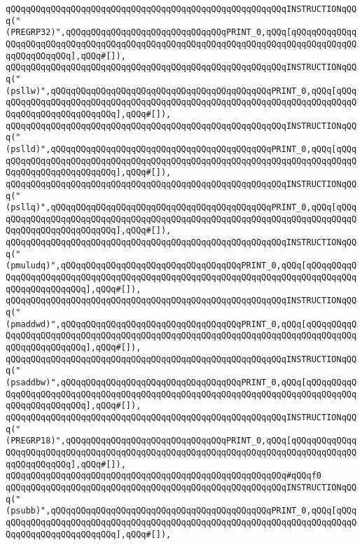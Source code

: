 \verb|qQQqqQQqqQQqqQQqqQQqqQQqqQQqqQQqqQQqqQQqqQQqqQQqqQQqqQQqINSTRUCTIONqQQq("(PREGRP32)",qQQqqQQqqQQqqQQqqQQqqQQqqQQqqQQqPRINT_0,qQQq[qQQqqQQqqQQqqQQqqQQqqQQqqQQqqQQqqQQqqQQqqQQqqQQqqQQqqQQqqQQqqQQqqQQqqQQqqQQqqQQqqQQqqQQqqQQqqQQq],qQQq#[]),|\newline
\verb|qQQqqQQqqQQqqQQqqQQqqQQqqQQqqQQqqQQqqQQqqQQqqQQqqQQqqQQqINSTRUCTIONqQQq("(psllw)",qQQqqQQqqQQqqQQqqQQqqQQqqQQqqQQqqQQqqQQqqQQqPRINT_0,qQQq[qQQqqQQqqQQqqQQqqQQqqQQqqQQqqQQqqQQqqQQqqQQqqQQqqQQqqQQqqQQqqQQqqQQqqQQqqQQqqQQqqQQqqQQqqQQqqQQq],qQQq#[]),|\newline
\verb|qQQqqQQqqQQqqQQqqQQqqQQqqQQqqQQqqQQqqQQqqQQqqQQqqQQqqQQqINSTRUCTIONqQQq("(pslld)",qQQqqQQqqQQqqQQqqQQqqQQqqQQqqQQqqQQqqQQqqQQqPRINT_0,qQQq[qQQqqQQqqQQqqQQqqQQqqQQqqQQqqQQqqQQqqQQqqQQqqQQqqQQqqQQqqQQqqQQqqQQqqQQqqQQqqQQqqQQqqQQqqQQqqQQq],qQQq#[]),|\newline
\verb|qQQqqQQqqQQqqQQqqQQqqQQqqQQqqQQqqQQqqQQqqQQqqQQqqQQqqQQqINSTRUCTIONqQQq("(psllq)",qQQqqQQqqQQqqQQqqQQqqQQqqQQqqQQqqQQqqQQqqQQqPRINT_0,qQQq[qQQqqQQqqQQqqQQqqQQqqQQqqQQqqQQqqQQqqQQqqQQqqQQqqQQqqQQqqQQqqQQqqQQqqQQqqQQqqQQqqQQqqQQqqQQqqQQq],qQQq#[]),|\newline
\verb|qQQqqQQqqQQqqQQqqQQqqQQqqQQqqQQqqQQqqQQqqQQqqQQqqQQqqQQqINSTRUCTIONqQQq("(pmuludq)",qQQqqQQqqQQqqQQqqQQqqQQqqQQqqQQqqQQqPRINT_0,qQQq[qQQqqQQqqQQqqQQqqQQqqQQqqQQqqQQqqQQqqQQqqQQqqQQqqQQqqQQqqQQqqQQqqQQqqQQqqQQqqQQqqQQqqQQqqQQqqQQq],qQQq#[]),|\newline
\verb|qQQqqQQqqQQqqQQqqQQqqQQqqQQqqQQqqQQqqQQqqQQqqQQqqQQqqQQqINSTRUCTIONqQQq("(pmaddwd)",qQQqqQQqqQQqqQQqqQQqqQQqqQQqqQQqqQQqPRINT_0,qQQq[qQQqqQQqqQQqqQQqqQQqqQQqqQQqqQQqqQQqqQQqqQQqqQQqqQQqqQQqqQQqqQQqqQQqqQQqqQQqqQQqqQQqqQQqqQQqqQQq],qQQq#[]),|\newline
\verb|qQQqqQQqqQQqqQQqqQQqqQQqqQQqqQQqqQQqqQQqqQQqqQQqqQQqqQQqINSTRUCTIONqQQq("(psaddbw)",qQQqqQQqqQQqqQQqqQQqqQQqqQQqqQQqqQQqPRINT_0,qQQq[qQQqqQQqqQQqqQQqqQQqqQQqqQQqqQQqqQQqqQQqqQQqqQQqqQQqqQQqqQQqqQQqqQQqqQQqqQQqqQQqqQQqqQQqqQQqqQQq],qQQq#[]),|\newline
\verb|qQQqqQQqqQQqqQQqqQQqqQQqqQQqqQQqqQQqqQQqqQQqqQQqqQQqqQQqINSTRUCTIONqQQq("(PREGRP18)",qQQqqQQqqQQqqQQqqQQqqQQqqQQqqQQqPRINT_0,qQQq[qQQqqQQqqQQqqQQqqQQqqQQqqQQqqQQqqQQqqQQqqQQqqQQqqQQqqQQqqQQqqQQqqQQqqQQqqQQqqQQqqQQqqQQqqQQqqQQq],qQQq#[]),|\newline
\verb|qQQqqQQqqQQqqQQqqQQqqQQqqQQqqQQqqQQqqQQqqQQqqQQqqQQqqQQq#qQQqf0|\newline
\verb|qQQqqQQqqQQqqQQqqQQqqQQqqQQqqQQqqQQqqQQqqQQqqQQqqQQqqQQqINSTRUCTIONqQQq("(psubb)",qQQqqQQqqQQqqQQqqQQqqQQqqQQqqQQqqQQqqQQqqQQqPRINT_0,qQQq[qQQqqQQqqQQqqQQqqQQqqQQqqQQqqQQqqQQqqQQqqQQqqQQqqQQqqQQqqQQqqQQqqQQqqQQqqQQqqQQqqQQqqQQqqQQqqQQq],qQQq#[]),|\newline
